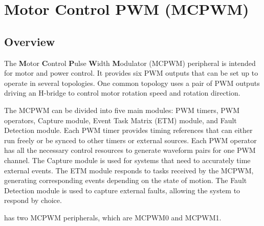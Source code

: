 \documentclass[main\_\_EN.tex]{subfiles}
\begin{document}

\ifglobal
\else
    {\let\clearpage\relax \listoftodos}
    {\let\clearpage\relax \listofdonetodos}
    \tableofcontents
\fi



\hypertarget{mcpwm}{}
\chapter{Motor Control PWM (MCPWM)}
\label{mod:mcpwm}


\section{Overview}

The \textbf{M}otor \textbf{C}ontrol \textbf{P}ulse \textbf{W}idth \textbf{M}odulator (MCPWM) peripheral is intended for motor and power control. It provides six PWM outputs that can be set up to operate in several topologies. One common topology uses a pair of PWM outputs driving an H-bridge to control motor rotation speed and rotation direction.

The MCPWM can be divided into five main modules: PWM timers, PWM operators, Capture module, Event Task Matrix (ETM) module, and Fault Detection module. Each PWM timer provides timing references that can either run freely or be synced to other timers or external sources. Each PWM operator has all the necessary control resources to generate waveform pairs for one PWM channel. The Capture module is used for systems that need to accurately time external events. The ETM module responds to tasks received by the MCPWM, generating corresponding events depending on the state of motion. The Fault Detection module is used to capture external faults, allowing the system to respond by choice.

\chipname{} has two MCPWM peripherals, which are MCPWM0 and MCPWM1.
\end{document}
